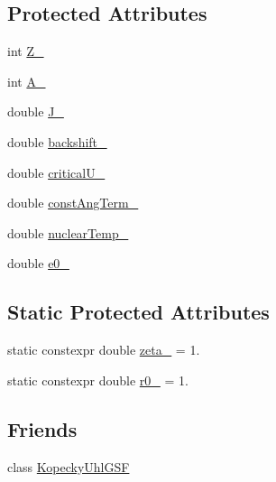 \subsection*{Protected Attributes}
\begin{DoxyCompactItemize}
\item 
int \hyperlink{classLevelDensity_a4e3c2f3637a11130dc5d0504bf0af9c9}{Z\-\_\-}
\item 
int \hyperlink{classLevelDensity_a49a372560d87e4bfda8759eb315a10ed}{A\-\_\-}
\item 
double \hyperlink{classLevelDensity_a20733f689cc018869ef19f2e6bcd3c87}{J\-\_\-}
\item 
double \hyperlink{classLevelDensity_ab38ac8b223b47b3f627b1d1443168b28}{backshift\-\_\-}
\item 
double \hyperlink{classLevelDensity_a580dc958baa563bf774a0a6f6b4fea7e}{critical\-U\-\_\-}
\item 
double \hyperlink{classLevelDensity_acfc91464640c910baac56f85751b7dac}{const\-Ang\-Term\-\_\-}
\item 
double \hyperlink{classLevelDensity_a7a97d015ef2f00caa58af1854ee492ca}{nuclear\-Temp\-\_\-}
\item 
double \hyperlink{classLevelDensity_a61c66e8f640cbffe7d2977d69981e30c}{e0\-\_\-}
\end{DoxyCompactItemize}
\subsection*{Static Protected Attributes}
\begin{DoxyCompactItemize}
\item 
static constexpr double \hyperlink{classLevelDensity_a853b9aa1ea19b486c4576c6d5d482caf}{zeta\-\_\-} = 1.
\item 
static constexpr double \hyperlink{classLevelDensity_a5ec748a62bd8277973d373a8b52292d7}{r0\-\_\-} = 1.
\end{DoxyCompactItemize}
\subsection*{Friends}
\begin{DoxyCompactItemize}
\item 
class \hyperlink{classLevelDensity_a82f9f4a3eb74ca7e08cb54054e30cd76}{Kopecky\-Uhl\-G\-S\-F}
\end{DoxyCompactItemize}


